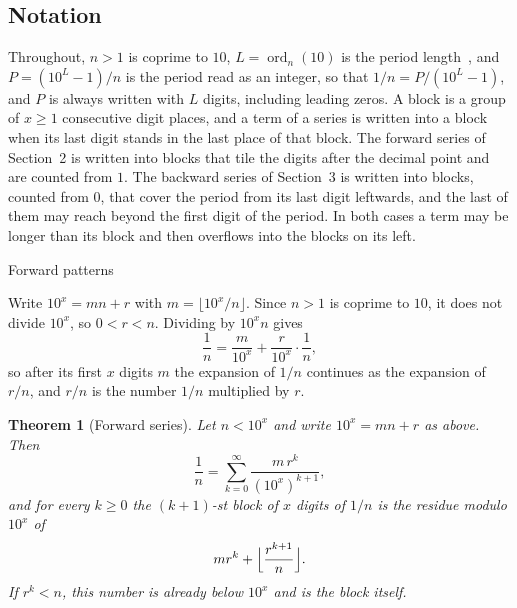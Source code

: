\documentclass[11pt,a4paper]{amsart}
\makeatletter
\def\section{\@startsection{section}{1}%
  \z@{-.7\linespacing\@plus-\linespacing}{.5\linespacing}%
  {\normalfont\scshape\centering}}
\newtheorem{theorem}{Theorem}
\theoremstyle{definition}
\theoremstyle{remark}
\newcommand{\ord}{\operatorname{ord}}
\makeatother
\begin{document}
\subsection*{Notation}
Throughout, $n > 1$ is coprime to $10$, $L = \ord_n(10)$ is the period
length~\cite{wiki-repeating}, and $P = (10^L - 1)/n$ is the period read as an
integer, so that $1/n = P/(10^L - 1)$, and $P$ is always written with $L$ digits, including leading zeros. A block is a group of $x \ge 1$ consecutive digit places, and a term of a series is written into a block when its last digit stands in the last place of that block. The forward series of Section~2 is written into blocks that tile the digits after the decimal point and are counted from $1$. The backward series of Section~3 is written into blocks, counted from $0$, that cover the period from its last digit leftwards, and the last of them may reach beyond the first digit of the period. In both cases a term may be longer than its block and then overflows into the blocks on its left.

\section{Forward patterns}

Write $10^x = mn + r$ with $m = \lfloor 10^x/n \rfloor$. Since $n > 1$ is
coprime to $10$, it does not divide $10^x$, so $0 < r < n$. Dividing by
$10^x n$ gives
\begin{equation}\label{eq:self}
\frac1n = \frac{m}{10^x} + \frac{r}{10^x}\cdot\frac1n ,
\end{equation}
so after its first $x$ digits $m$ the expansion of $1/n$ continues as the
expansion of $r/n$, and $r/n$ is the number $1/n$ multiplied by $r$.

\begin{theorem}[Forward series]\label{thm:forward}
Let $n < 10^x$ and write $10^x = mn + r$ as above. Then
\begin{equation}\label{eq:forward}
\frac1n = \sum_{k=0}^{\infty} \frac{m\,r^k}{(10^x)^{k+1}} ,
\end{equation}
and for every $k \ge 0$ the $(k+1)$-st block of $x$ digits of $1/n$ is the
residue modulo $10^x$ of
\begin{equation}\label{eq:block}
m r^k + \Bigl\lfloor \frac{r^{k+1}}{n} \Bigr\rfloor .
\end{equation}
If $r^k < n$, this number is already below $10^x$ and is the block itself.
\end{theorem}
\end{document}
